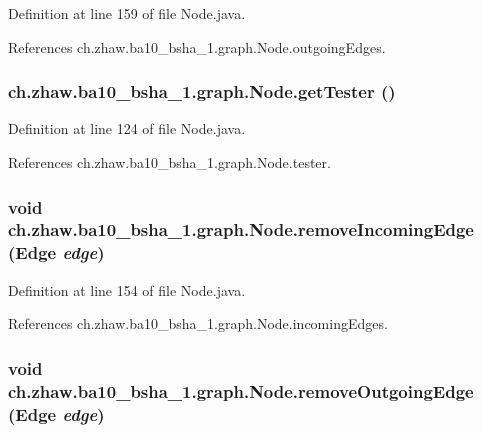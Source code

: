 Definition at line 159 of file Node.java.

References ch.zhaw.ba10\_\-bsha\_\-1.graph.Node.outgoingEdges.\hypertarget{classch_1_1zhaw_1_1ba10__bsha__1_1_1graph_1_1Node_a25060c21d8718f9c9685ed20446e4611}{
\subsubsection[{getTester}]{ ch.zhaw.ba10\_\-bsha\_\-1.graph.Node.getTester ()}}
\label{classch_1_1zhaw_1_1ba10__bsha__1_1_1graph_1_1Node_a25060c21d8718f9c9685ed20446e4611}


Definition at line 124 of file Node.java.

References ch.zhaw.ba10\_\-bsha\_\-1.graph.Node.tester.\hypertarget{classch_1_1zhaw_1_1ba10__bsha__1_1_1graph_1_1Node_aa309007d5babe035612662009aa65471}{
\subsubsection[{removeIncomingEdge}]{\setlength{\rightskip}{0pt plus 5cm}void ch.zhaw.ba10\_\-bsha\_\-1.graph.Node.removeIncomingEdge ({\bf Edge} {\em edge})}}
\label{classch_1_1zhaw_1_1ba10__bsha__1_1_1graph_1_1Node_aa309007d5babe035612662009aa65471}


Definition at line 154 of file Node.java.

References ch.zhaw.ba10\_\-bsha\_\-1.graph.Node.incomingEdges.\hypertarget{classch_1_1zhaw_1_1ba10__bsha__1_1_1graph_1_1Node_ad31d9211d2a1fa2984f02f2faa37c6f1}{
\subsubsection[{removeOutgoingEdge}]{\setlength{\rightskip}{0pt plus 5cm}void ch.zhaw.ba10\_\-bsha\_\-1.graph.Node.removeOutgoingEdge ({\bf Edge} {\em edge})}}
\label{classch_1_1zhaw_1_1ba10__bsha__1_1_1graph_1_1Node_ad31d9211d2a1fa2984f02f2faa37c6f1}


